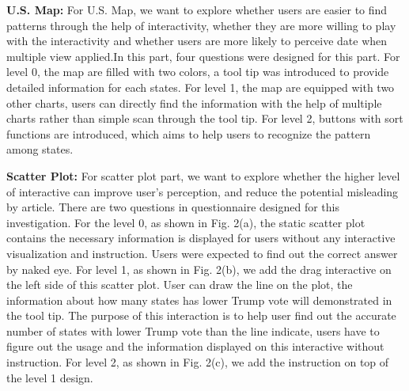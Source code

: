 \documentclass[9pt,journal,compsoc]{IEEEtran}
\begin{document}
\textbf{U.S. Map:} For U.S. Map, we want to explore whether users are easier to find patterns through the help of interactivity, whether they are more willing to play with the interactivity and whether users are more likely to perceive date when multiple view applied.In this part, four questions were designed for this part. For level 0, the map are filled with two colors, a tool tip was introduced to provide detailed information for each states. For level 1, the map are equipped with two other charts, users can directly find the information with the help of multiple charts rather than simple scan through the tool tip. For level 2, buttons with sort functions are introduced, which aims to help users to recognize the pattern among states.

\textbf{Scatter Plot:} For scatter plot part, we want to explore whether the higher level of interactive can improve user's perception, and reduce the potential misleading by article. There are two questions in questionnaire designed for this investigation. For the level 0, as shown in Fig. 2(a), the static scatter plot contains the necessary information is displayed for users without any interactive visualization and instruction. Users were expected to find out the correct answer by naked eye. For level 1, as shown in Fig. 2(b), we add the drag interactive on the left side of this scatter plot. User can draw the line on the plot, the information about how many states has lower Trump vote will demonstrated in the tool tip. The purpose of this interaction is to help user find out the accurate number of states with lower Trump vote than the line indicate, users have to figure out the usage and the information displayed on this interactive without instruction.  For level 2, as shown in Fig. 2(c), we add the instruction on top of the level 1 design. 
\end{document}
